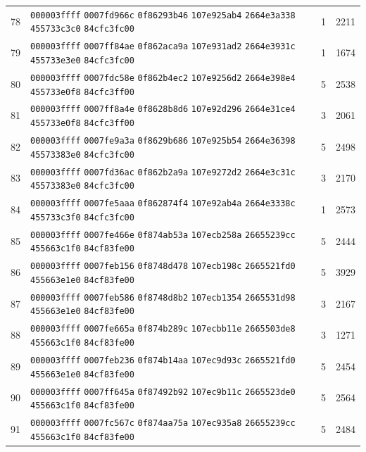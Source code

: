 \begin{longtable}{@{}r p{12cm} r r@{}}
78 & \texttt{000003ffff} \texttt{0007fd966c} \texttt{0f86293b46} \texttt{107e925ab4} \texttt{2664e3a338} \texttt{455733c3c0} \texttt{84cfc3fc00} & 1 & 2211 \\
79 & \texttt{000003ffff} \texttt{0007ff84ae} \texttt{0f862aca9a} \texttt{107e931ad2} \texttt{2664e3931c} \texttt{455733e3e0} \texttt{84cfc3fc00} & 1 & 1674 \\
80 & \texttt{000003ffff} \texttt{0007fdc58e} \texttt{0f862b4ec2} \texttt{107e9256d2} \texttt{2664e398e4} \texttt{455733e0f8} \texttt{84cfc3ff00} & 5 & 2538 \\
81 & \texttt{000003ffff} \texttt{0007ff8a4e} \texttt{0f8628b8d6} \texttt{107e92d296} \texttt{2664e31ce4} \texttt{455733e0f8} \texttt{84cfc3ff00} & 3 & 2061 \\
82 & \texttt{000003ffff} \texttt{0007fe9a3a} \texttt{0f8629b686} \texttt{107e925b54} \texttt{2664e36398} \texttt{45573383e0} \texttt{84cfc3fc00} & 5 & 2498 \\
83 & \texttt{000003ffff} \texttt{0007fd36ac} \texttt{0f862b2a9a} \texttt{107e9272d2} \texttt{2664e3c31c} \texttt{45573383e0} \texttt{84cfc3fc00} & 3 & 2170 \\
84 & \texttt{000003ffff} \texttt{0007fe5aaa} \texttt{0f862874f4} \texttt{107e92ab4a} \texttt{2664e3338c} \texttt{455733c3f0} \texttt{84cfc3fc00} & 1 & 2573 \\
85 & \texttt{000003ffff} \texttt{0007fe466e} \texttt{0f874ab53a} \texttt{107ecb258a} \texttt{26655239cc} \texttt{455663c1f0} \texttt{84cf83fe00} & 5 & 2444 \\
86 & \texttt{000003ffff} \texttt{0007feb156} \texttt{0f8748d478} \texttt{107ecb198c} \texttt{2665521fd0} \texttt{455663e1e0} \texttt{84cf83fe00} & 5 & 3929 \\
87 & \texttt{000003ffff} \texttt{0007feb586} \texttt{0f8748d8b2} \texttt{107ecb1354} \texttt{2665531d98} \texttt{455663e1e0} \texttt{84cf83fe00} & 3 & 2167 \\
88 & \texttt{000003ffff} \texttt{0007fe665a} \texttt{0f874b289c} \texttt{107ecbb11e} \texttt{2665503de8} \texttt{455663c1f0} \texttt{84cf83fe00} & 3 & 1271 \\
89 & \texttt{000003ffff} \texttt{0007feb236} \texttt{0f874b14aa} \texttt{107ec9d93c} \texttt{2665521fd0} \texttt{455663e1e0} \texttt{84cf83fe00} & 5 & 2454 \\
90 & \texttt{000003ffff} \texttt{0007ff645a} \texttt{0f87492b92} \texttt{107ec9b11c} \texttt{2665523de0} \texttt{455663c1f0} \texttt{84cf83fe00} & 5 & 2564 \\
91 & \texttt{000003ffff} \texttt{0007fc567c} \texttt{0f874aa75a} \texttt{107ec935a8} \texttt{26655239cc} \texttt{455663c1f0} \texttt{84cf83fe00} & 5 & 2484 \\

\end{longtable}
